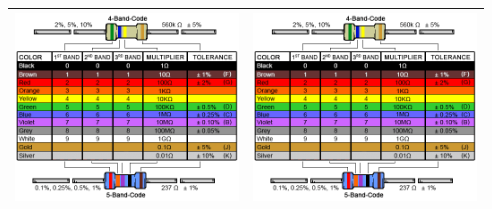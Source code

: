 \documentclass[oneside]{article}
\begin{document}
\begin{tabularx}{\linewidth}{| >{\centering\arraybackslash}X | >{\centering\arraybackslash}X |}
        \includegraphics[height=5cm]{Extras/resistor_chart} & \includegraphics[height=5cm]{Extras/resistor_chart}\\\hline
    \end{tabularx}
\end{document}
